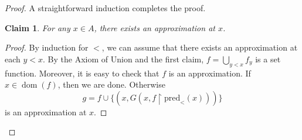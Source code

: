 \documentclass[a4paper, 11pt]{amsart}
\newtheorem*{claim*}{Claim}
\theoremstyle{remark}
\newcommand{\pred}{\mathrm{pred}}
\DeclareMathOperator{\dom}{dom}
\begin{document}
\begin{proof}
A straightforward induction completes the proof. 

\begin{claim*} 
For any $x\in A$, there exists an approximation at $x$. 
\end{claim*} 
\begin{proof} 
By induction for $<$, we can assume that there exists an approximation at each $y<x$. 
By the Axiom of Union and the first claim, $f=\bigcup_{y<x} f_y$ is a set function. 
Moreover, it is easy to check that $f$ is an approximation. 
If $x\in \dom(f)$, then we are done. 
Otherwise 
$$g=f\cup \{ (x, G(x,f{\upharpoonright}\pred_<(x))) \}$$ 
is an approximation at $x$. 
\end{proof} 

\iffalse 
\begin{claim*} 
Suppose that $x\in A$ and there is a $x$-approximation $f$. 
Then there is a $\subseteq$-least $x$-approximation. 
\end{claim*} 
\begin{proof} 
The intersection of all $x$-approximations equals  
$$h := \{ (a,b)\in f \mid \text{ for all $x$-approximations } g:\   (a,b)\in g \}.$$ 
This is a set by the Separation Scheme. 

Using the previous claim, one can easily check (1) and (2) for $h$, so $h$ is an $x$-approximation. 
\end{proof} 

\begin{claim*} 
For any $x\in A$, there exists an $x$-approximation. 
\end{claim*} 
\begin{proof} 
We show this by induction on $<$. 
Suppose that for all $y<x$, there exists a $y$-approximation. 
Suppose that $f_y$ is the $\subseteq$-least $y$-approximation. 
Then $f=\bigcup_{y<x} f_y$ is a function by the first claim.  
Therefore, $f$ is a $y$-approximation for all $y<x$. 
Then 
$$g=f\cup \{ (x, G(x,f{\upharpoonright}\pred_<(x))) \}$$ 
is an $x$-approximation. 
\end{proof} 
\fi 


\end{proof}
\end{document}
